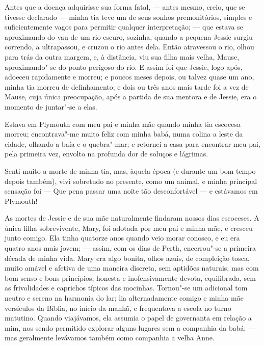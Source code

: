 Antes que a doença adquirisse sua forma fatal, --- antes mesmo, creio,
que se tivesse declarado --- minha tia teve um de seus sonhos
premonitórios, simples e suficientemente vagos para permitir qualquer
interpretação; --- que estava se aproximando do vau de um rio escuro,
sozinha, quando a pequena Jessie surgiu correndo, a ultrapassou, e
cruzou o rio antes dela. Então atravessou o rio, olhou para trás da
outra margem, e, à distância, viu sua filha mais velha, Mause,
aproximando"-se do ponto perigoso do rio. E assim foi que Jessie, logo
após, adoeceu rapidamente e morreu; e poucos meses depois, ou talvez
quase um ano, minha tia morreu de definhamento; e dois ou três anos mais
tarde foi a vez de Mause, cuja única preocupação, após a partida de sua
mentora e de Jessie, era o momento de juntar"-se a elas.

Estava em Plymouth com meu pai e minha mãe quando minha tia escocesa
morreu; encontrava"-me muito feliz com minha babá, numa colina a leste da
cidade, olhando a baía e o quebra"-mar; e retornei a casa para encontrar
meu pai, pela primeira vez, envolto na profunda dor de soluços e
lágrimas.

Senti muito a morte de minha tia, mas, àquela época (e durante um bom
tempo depois também), vivi sobretudo no presente, como um animal, e
minha principal sensação foi --- Que pena passar uma noite tão
desconfortável --- e estávamos em Plymouth!

As mortes de Jessie e de sua mãe naturalmente findaram nossos dias
escoceses. A única filha sobrevivente, Mary, foi adotada por meu pai e
minha mãe, e cresceu junto comigo. Ela tinha quatorze anos quando veio
morar conosco, e eu era quatro anos mais jovem; --- assim, com os dias de
Perth, encerrou"-se a primeira década de minha vida. Mary era algo
bonita, olhos azuis, de compleição tosca, muito amável e afetiva de uma
maneira discreta, sem aptidões naturais, mas com bom senso e bons
princípios, honesta e inofensivamente devota, equilibrada, sem as
frivolidades e caprichos típicos das mocinhas. Tornou"-se um adicional
tom neutro e sereno na harmonia do lar; lia alternadamente comigo e minha
mãe versículos da Bíblia, no início da manhã, e frequentava a escola no
turno matutino. Quando viajávamos, ela assumia o papel de governanta em
relação a mim, nos sendo permitido explorar alguns lugares sem a
companhia da babá; --- mas geralmente levávamos também como companhia a
velha Anne.

